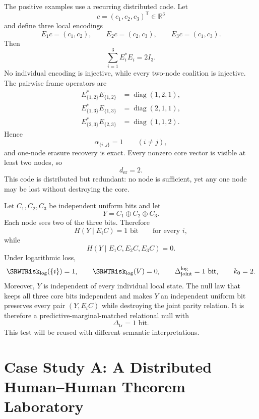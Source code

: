 
The positive examples use a recurring distributed code. Let
\[
c=(c_1,c_2,c_3)^{\mathsf T}\in\mathbb R^3
\]
and define three local encodings
\[
E_1c=(c_1,c_2),
\qquad
E_2c=(c_2,c_3),
\qquad
E_3c=(c_1,c_3).
\]
Then
\[
\sum_{i=1}^3E_i^*E_i=2I_3.
\]
No individual encoding is injective, while every two-node coalition is
injective. The pairwise frame operators are
\[
\begin{aligned}
E_{\{1,2\}}^*E_{\{1,2\}}&=\operatorname{diag}(1,2,1),\\
E_{\{1,3\}}^*E_{\{1,3\}}&=\operatorname{diag}(2,1,1),\\
E_{\{2,3\}}^*E_{\{2,3\}}&=\operatorname{diag}(1,1,2).
\end{aligned}
\]
Hence
\[
\alpha_{\{i,j\}}=1
\qquad(i\neq j),
\]
and one-node erasure recovery is exact. Every nonzero core vector is visible
at least two nodes, so
\[
d_{\mathrm{er}}=2.
\]
This code is distributed but redundant: no node is sufficient, yet any one
node may be lost without destroying the core.


Let \(C_1,C_2,C_3\) be independent uniform bits and let
\[
Y=C_1\oplus C_2\oplus C_3.
\]
Each node sees two of the three bits. Therefore
\[
H(Y\mid E_iC)=1\text{ bit}
\qquad\text{for every }i,
\]
while
\[
H(Y\mid E_1C,E_2C,E_3C)=0.
\]
Under logarithmic loss,
\[
\SRWTRisk_{\log}(\{i\})=1,
\qquad
\SRWTRisk_{\log}(V)=0,
\qquad
\Delta_{\mathrm{joint}}^{\log}=1\text{ bit},
\qquad
k_0=2.
\]
Moreover, \(Y\) is independent of every individual local state. The null law
that keeps all three core bits independent and makes \(Y\) an independent
uniform bit preserves every pair \((Y,E_iC)\) while destroying the joint parity
relation. It is therefore a predictive-marginal-matched relational null with
\[
\Delta_{\mathrm{tr}}=1\text{ bit}.
\]
This test will be reused with different semantic interpretations.

\section{Case Study A: A Distributed Human--Human Theorem Laboratory}


